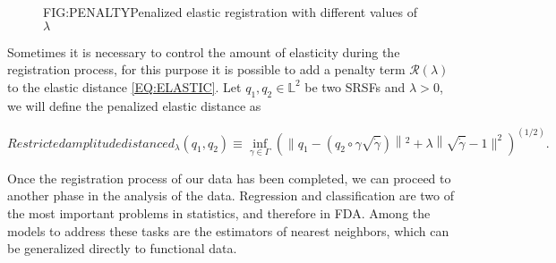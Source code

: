 
\begin{figure}[Penalized elastic registration]{FIG:PENALTY}{Penalized elastic registration with different values of $\lambda$}
	 \quad
\end{figure}

Sometimes it is necessary to control the amount of elasticity during the
registration process, for this purpose it is possible to add a penalty term
$\mathcal{R}(\lambda)$ to the elastic distance \ref{EQ:ELASTIC}.
Let $q_1, q_2 \in \mathbb{L}^2$ be two SRSFs and $\lambda > 0$, we will define
the penalized elastic distance as

\begin{equation}[]{Restricted amplitude distance}
d_{\lambda}\left(q_{1}, q_{2}\right) \equiv \inf _{\gamma \in \Gamma}\left(
\| q_{1}-\left(q_{2} \circ \gamma \sqrt{\dot{\gamma}}\right)\left\|^{2}+
\lambda\right\| \sqrt{\dot{\gamma}}-1 \|^{2} \right)^{(1 / 2)}.
\end{equation}

Once the registration process of our data has been completed,
we can proceed to another phase in the analysis of the data.
Regression and classification are two of the most important problems in
statistics, and therefore in FDA.
Among the models to address these tasks are the estimators of nearest neighbors,
 which can be generalized directly to functional data.

